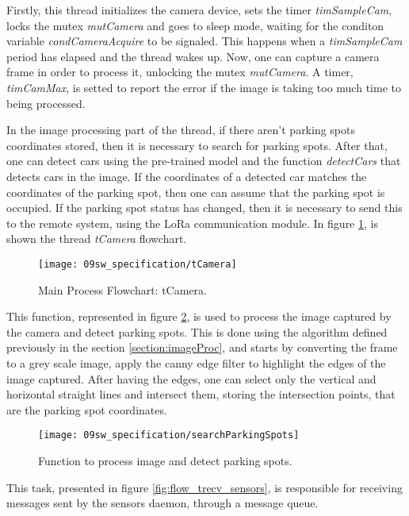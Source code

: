 Firstly, this thread initializes the camera device, sets the timer \textit{timSampleCam}, locks the mutex \textit{mutCamera} and goes to sleep mode, waiting for the conditon variable \textit{condCameraAcquire} to be signaled. This happens when a \textit{timSampleCam} period has elapsed and the thread wakes up. Now, one can capture a camera frame in order to process it, unlocking the mutex \textit{mutCamera}. A timer, \textit{timCamMax}, is setted to report the error if the image is taking too much time to being processed.

In the image processing part of the thread, if there aren't parking spots coordinates stored, then it is necessary to search for parking spots. After that, one can detect cars using the pre-trained model and the function \textit{detectCars} that detects cars in the image. If the coordinates of a detected car matches the coordinates of the parking spot, then one can assume that the parking spot is occupied. If the parking spot status has changed, then it is necessary to send this to the remote system, using the LoRa communication module. In figure \ref{fig:flow_tcamera}, is shown the thread \textit{tCamera} flowchart.

\begin{figure}[H]
	\centering			
	\texttt{[image: 09sw\_specification/tCamera]}
	\caption{Main Process Flowchart: tCamera.}
	\label{fig:flow_tcamera}
\end{figure}


This function, represented in figure \ref{fig:search}, is used to process the image captured by the camera and detect parking spots. This is done using the algorithm defined previously in the section \ref{section:imageProc}, and starts by converting the frame to a grey scale image, apply the canny edge filter to highlight the edges of the image captured. After having the edges, one can select only the vertical and horizontal straight lines and intersect them, storing the intersection points, that are the parking spot coordinates.

\begin{figure}[H]
	\centering			
	\texttt{[image: 09sw\_specification/searchParkingSpots]}
	\caption{Function to process image and detect parking spots.}
	\label{fig:search}
\end{figure}



This task, presented in figure \ref{fig:flow_trecv_sensors}, is responsible for receiving messages sent by the sensors daemon, through a message queue.

